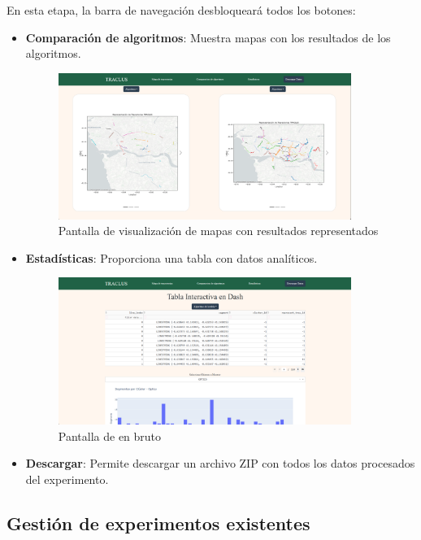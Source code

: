 En esta etapa, la barra de navegación desbloqueará todos los botones:

\begin{itemize}
    \item \textbf{Comparación de algoritmos}: Muestra mapas con los resultados de los algoritmos.
    
\begin{figure}[H]
    \centering
    \includegraphics[width=0.9\textwidth]{img/TRACLUSMap_page.png}
    \caption{Pantalla de visualización de mapas con resultados representados}
\end{figure}
    
    \item \textbf{Estadísticas}: Proporciona una tabla con datos analíticos.
    
\begin{figure}[H]
    \centering
    \includegraphics[width=0.9\textwidth]{img/estadistic_page.png}
    \caption{Pantalla de en bruto}
\end{figure}

    \item \textbf{Descargar}: Permite descargar un archivo ZIP con todos los datos procesados del experimento.
\end{itemize}

\subsection{Gestión de experimentos existentes}

